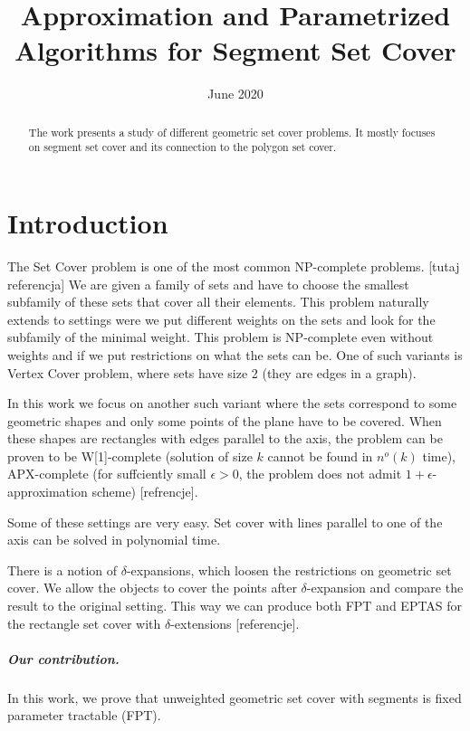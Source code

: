 \documentclass[en]{pracamgr}
\title{Approximation and Parametrized Algorithms for Segment Set Cover}
\date{June 2020}
\begin{document}
\maketitle

\begin{abstract}
  The work presents a study
  of different geometric set cover problems.
  It mostly focuses on segment set cover
  and its connection to the polygon set cover.
\end{abstract}

\tableofcontents

\chapter{Introduction}

The Set Cover problem is one of the most common NP-complete problems.
[tutaj referencja]
We are given a family of sets and have to choose the smallest
subfamily of these sets that cover all their elements.
This problem naturally extends to settings
were we put different weights on the sets
and look for the subfamily of the minimal weight.
This problem is NP-complete even 
without weights and if we put
restrictions on what the sets can be.
One of such variants is Vertex Cover problem,
where sets have size 2 (they are edges in a graph).

In this work we focus on another such variant where the sets correspond
to some geometric shapes and
only some points of the plane have to be covered.
When these shapes are rectangles with edges parallel
to the axis, the problem can be proven to
be W[1]-complete (solution of size $k$ cannot be found
in $n^o(k)$ time),
APX-complete (for suffciently small $\epsilon > 0$, the problem
does not admit $1+\epsilon$-approximation scheme)
[refrencje].

Some of these settings are very easy.
Set cover with lines parallel to one of the axis
can be solved in polynomial time.

There is a notion of $\delta$-expansions,
which loosen the restrictions on geometric set cover.
We allow the objects to cover the points
after $\delta$-expansion and compare
the result to the original setting.
This way we can produce both FPT and EPTAS
for the rectangle set cover with $\delta$-extensions
[referencje].



\paragraph{Our contribution.}
In this work, we prove that unweighted geometric set cover
with segments is fixed parameter tractable (FPT).
\end{document}
